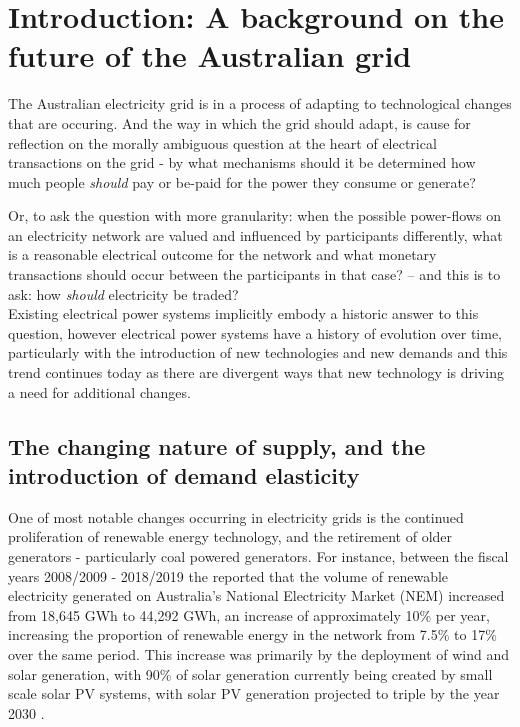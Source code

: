 \chapter{Introduction: A background on the future of the Australian grid}
\label{cha:intro}

The Australian electricity grid is in a process of adapting to technological changes that are occuring.
And the way in which the grid should adapt, is cause for reflection on the morally ambiguous question at the heart of electrical transactions on the grid - by what mechanisms should it be determined how much people \textit{should} pay or be-paid for the power they consume or generate?

Or, to ask the question with more granularity: when the possible power-flows on an electricity network are valued and influenced by participants differently, 
what is a reasonable electrical outcome for the network and what monetary transactions should occur between the participants in that case? -- and this is to ask: how \textit{should} electricity be traded?\\

Existing electrical power systems implicitly embody a historic answer to this question, however electrical power systems have a history of evolution over time, particularly with the introduction of new technologies and new demands and this trend continues today as there are divergent ways that new technology is driving a need for additional changes.

\section{The changing nature of supply, and the introduction of demand elasticity}

One of most notable changes occurring in electricity grids is the continued proliferation of renewable energy technology, and the retirement of older generators - particularly coal powered generators.
For instance, between the fiscal years 2008/2009 - 2018/2019 the \cite{departmentoftheenvironmentenergy2018} reported that the volume of renewable electricity generated on Australia's National Electricity Market (NEM) increased from 18,645 GWh to 44,292 GWh, an increase of approximately 10\% per year, increasing the proportion of renewable energy in the network from 7.5\% to 17\% over the same period.
This increase was primarily by the deployment of wind and solar generation, with 90\% of solar generation currently being created by small scale solar PV systems, with solar PV generation projected to triple by the year 2030 \citep{australianenergymarketoperatorlimited2018}.

